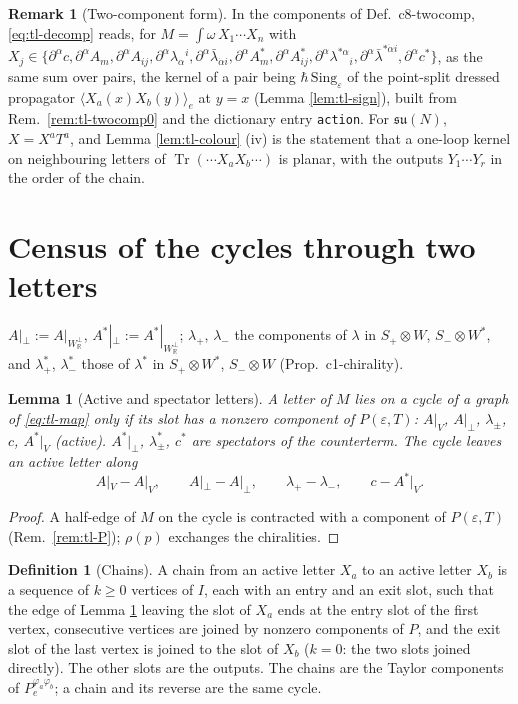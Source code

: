 \documentclass[11pt]{article}
\numberwithin{equation}{section}
\theoremstyle{plain}
\newtheorem{lemma}[theorem]{Lemma}
\theoremstyle{definition}
\newtheorem{definition}[theorem]{Definition}
\newtheorem{remark}[theorem]{Remark}
\begin{document}
\begin{remark}[Two-component form]
In the components of Def.~c8-twocomp, \eqref{eq:tl-decomp} reads, for $M=\int\omega\,X_1\cdots X_n$ with $X_j\in\{\partial^\alpha c,\partial^\alpha A_m,\partial^\alpha A_{ij},\partial^\alpha\lambda_\alpha{}^i,\partial^\alpha\bar\lambda_{\dot\alpha i},\partial^\alpha A^*_m,\partial^\alpha A^*_{ij},\partial^\alpha\lambda^{*\alpha}{}_i,\partial^\alpha\bar\lambda^{*\dot\alpha i},\partial^\alpha c^*\}$, as the same sum over pairs, the kernel of a pair being $\hbar\,\mathrm{Sing}_\varepsilon$ of the point-split dressed propagator $\langle X_a(x)X_b(y)\rangle_e$ at $y=x$ (Lemma \ref{lem:tl-sign}), built from Rem.~\ref{rem:tl-twocomp0} and the dictionary entry \texttt{action}. For $\mathfrak{su}(N)$, $X=X^aT^a$, and Lemma \ref{lem:tl-colour} (iv) is the statement that a one-loop kernel on neighbouring letters of $\operatorname{Tr}(\cdots X_aX_b\cdots)$ is planar, with the outputs $Y_1\cdots Y_r$ in the order of the chain.
\end{remark}


\section{Census of the cycles through two letters}
\label{sec:tl-census}

$A|_\perp:=A|_{W_{\mathbb R}^\perp}$, $A^*|_\perp:=A^*|_{W_{\mathbb R}^\perp}$; $\lambda_+$, $\lambda_-$ the components of $\lambda$ in $S_+\otimes W$, $S_-\otimes W^*$, and $\lambda^*_+$, $\lambda^*_-$ those of $\lambda^*$ in $S_+\otimes W^*$, $S_-\otimes W$ (Prop.~c1-chirality).

\begin{lemma}[Active and spectator letters]
\label{lem:tl-active}
A letter of $M$ lies on a cycle of a graph of \eqref{eq:tl-map} only if its slot has a nonzero component of $P(\varepsilon,T)$: $A|_V$, $A|_\perp$, $\lambda_\pm$, $c$, $A^*|_V$ (active). $A^*|_\perp$, $\lambda^*_\pm$, $c^*$ are spectators of the counterterm. The cycle leaves an active letter along
\[
A|_V\!-\!A|_V,\qquad A|_\perp\!-\!A|_\perp,\qquad \lambda_+\!-\!\lambda_-,\qquad c\!-\!A^*|_V .
\]
\end{lemma}

\begin{proof}
A half-edge of $M$ on the cycle is contracted with a component of $P(\varepsilon,T)$ (Rem.~\ref{rem:tl-P}); $\rho(p)$ exchanges the chiralities.
\end{proof}

\begin{definition}[Chains]
\label{def:tl-chain}
A chain from an active letter $X_a$ to an active letter $X_b$ is a sequence of $k\ge0$ vertices of $I$, each with an entry and an exit slot, such that the edge of Lemma \ref{lem:tl-active} leaving the slot of $X_a$ ends at the entry slot of the first vertex, consecutive vertices are joined by nonzero components of $P$, and the exit slot of the last vertex is joined to the slot of $X_b$ ($k=0$: the two slots joined directly). The other slots are the outputs. The chains are the Taylor components of $P_e^{\varphi_a\varphi_b}$; a chain and its reverse are the same cycle.
\end{definition}
\end{document}
